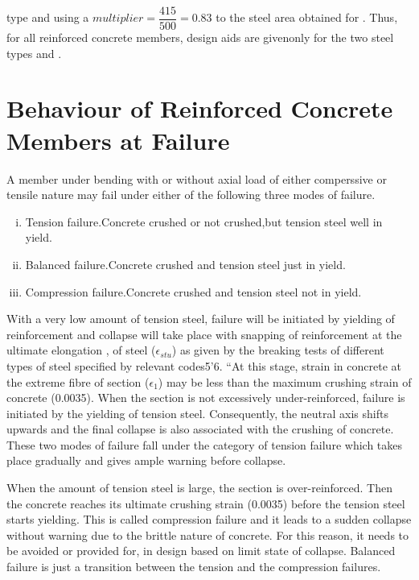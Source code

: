 type {\fefouronefive} and using a $multiplier=\dfrac{415}{500} = 0.83$ to the steel area obtained for {\fefouronefive}. Thus, for all reinforced concrete members, design aids are givenonly for the two steel types {\fetwofivezero} and {\fefouronefive}.

\section{Behaviour of Reinforced Concrete Members at Failure}

A member under bending with or without axial load of either comperssive
or tensile nature may fail under either of the following three modes of
failure.

\begin{enumerate}[(i)]
\item Tension failure.Concrete crushed or not crushed,but tension steel well in yield.
\item Balanced failure.Concrete crushed and tension steel just in yield.
\item Compression failure.Concrete crushed and tension steel not in yield.
\end{enumerate}
With a very low amount of tension steel, failure will be initiated by
yielding of reinforcement and collapse will take place with snapping of
reinforcement at the ultimate elongation , of steel ($\epsilon_{stu}$) as given by the breaking tests of different types of steel speciﬁed by relevant
codes5’6. “At this stage, strain in concrete at the extreme fibre of 
section ($\epsilon_1$) may be less than the maximum crushing strain of concrete (0.0035). When the section is not excessively under-reinforced, failure
is initiated by the yielding of tension steel. Consequently, the neutral
axis shifts upwards and the final collapse is also associated with the
crushing of concrete. These two modes of failure fall under the category
of tension failure which takes place gradually and gives ample warning
before collapse.

When the amount of tension steel is large, the section is over-reinforced.
Then the concrete reaches its ultimate crushing strain (0.0035)
before the tension steel starts yielding. This is called compression
failure and it leads to a sudden collapse without warning due to the
brittle nature of concrete. For this reason, it needs to be avoided or
provided for, in design based on limit state of collapse. Balanced
failure is just a transition between the tension and the compression
failures.

